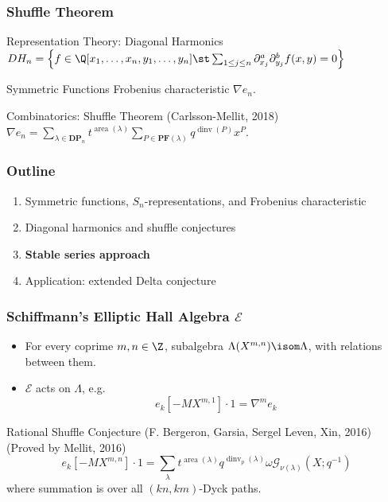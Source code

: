\documentclass{beamer}
\newcommand{\sym}{\Lambda}
\DeclareMathOperator{\area}{area}
\DeclareMathOperator{\dinv}{dinv}
\newcommand{\DP}{\mathbf{DP}}
\newcommand{\PF}{\mathbf{PF}}
\newcommand{\Gcal}{\mathcal{G}}
\newcommand{\Ecal}{{\mathcal E}}
\begin{document}
\begin{frame}
  \frametitle{Shuffle Theorem}
  \begin{block}{Representation Theory: Diagonal Harmonics}
    \(DH_n = \left\{ f \in \Q[x_1,\ldots,x_n,y_1,\ldots,y_n] \st
    \sum_{1 \leq j \leq n} \partial_{x_j}^a \partial_{y_j}^b f(x,y) =
    0 \right\}\)
  \end{block}\pause
  \begin{block}{Symmetric Functions}
    Frobenius characteristic \(\nabla e_n\).
  \end{block}\pause
  \begin{block}{Combinatorics: Shuffle Theorem (Carlsson-Mellit, 2018)}
    \(\nabla e_n = \sum_{\lambda \in \DP_n} t^{\area(\lambda)} \sum_{P
    \in \PF(\lambda)} q^{\dinv(P)} x^P\).
  \end{block}
\end{frame}
\begin{frame}
  \frametitle{Outline}
  \begin{enumerate}
  \item Symmetric functions, \(S_n\)-representations, and Frobenius characteristic
  \item Diagonal harmonics and shuffle conjectures
  \item {\bf Stable series approach}
  \item Application: extended Delta conjecture
  \end{enumerate}
\end{frame}
\begin{frame}
  \frametitle{Schiffmann's Elliptic Hall Algebra \(\Ecal\)}
  \begin{itemize}
  \item For every coprime \(m,n \in \Z\), subalgebra \(\sym(X^{m,n})
    \isom \sym\), with relations between them.\pause
  \item \(\Ecal\) acts on \(\sym\), e.g. \[
      e_k[-MX^{m,1}] \cdot 1 = \nabla^m e_k
    \]\pause
  \end{itemize}
  \begin{block}{Rational Shuffle Conjecture (F. Bergeron, Garsia,
      Sergel Leven, Xin, 2016) (Proved by Mellit, 2016)}
    \[e_k[-MX^{m,n}] \cdot 1 = \sum_\lambda t^{\area(\lambda)}
    q^{\dinv_p(\lambda)} \omega \Gcal_{\nu(\lambda)}(X;q^{-1})\]
  where summation is over all \((kn,km)\)-Dyck paths.
  \end{block}
\end{frame}
\end{document}
